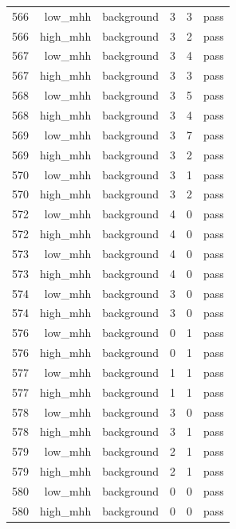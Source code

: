 \begin{table}[htbp]
{\begin{tabular}{lrrrrr}
566 & low\_mhh & background & 3 & 3 & pass \\
566 & high\_mhh & background & 3 & 2 & pass \\
567 & low\_mhh & background & 3 & 4 & pass \\
567 & high\_mhh & background & 3 & 3 & pass \\
568 & low\_mhh & background & 3 & 5 & pass \\
568 & high\_mhh & background & 3 & 4 & pass \\
569 & low\_mhh & background & 3 & 7 & pass \\
569 & high\_mhh & background & 3 & 2 & pass \\
570 & low\_mhh & background & 3 & 1 & pass \\
570 & high\_mhh & background & 3 & 2 & pass \\
572 & low\_mhh & background & 4 & 0 & pass \\
572 & high\_mhh & background & 4 & 0 & pass \\
573 & low\_mhh & background & 4 & 0 & pass \\
573 & high\_mhh & background & 4 & 0 & pass \\
574 & low\_mhh & background & 3 & 0 & pass \\
574 & high\_mhh & background & 3 & 0 & pass \\
576 & low\_mhh & background & 0 & 1 & pass \\
576 & high\_mhh & background & 0 & 1 & pass \\
577 & low\_mhh & background & 1 & 1 & pass \\
577 & high\_mhh & background & 1 & 1 & pass \\
578 & low\_mhh & background & 3 & 0 & pass \\
578 & high\_mhh & background & 3 & 1 & pass \\
579 & low\_mhh & background & 2 & 1 & pass \\
579 & high\_mhh & background & 2 & 1 & pass \\
580 & low\_mhh & background & 0 & 0 & pass \\
580 & high\_mhh & background & 0 & 0 & pass \\
\bottomrule
\end{tabular}
}
\end{table}
